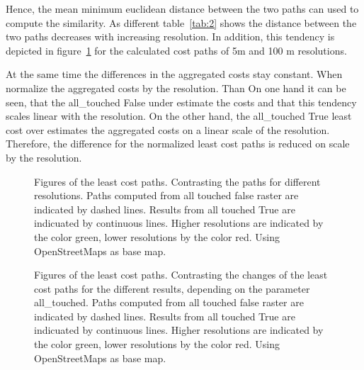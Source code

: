 \documentclass[acmtog]{acmart}
\begin{document}
	Hence, the mean minimum euclidean distance between the two paths can used to compute
	the similarity.
	As different table~\ref{tab:2} shows the distance between the two paths decreases
	with increasing resolution.
	In addition, this tendency is depicted in figure~\ref{fig:paths_resolution} for the calculated cost paths of 5m and 100 m resolutions.
	
	At the same time the differences in the aggregated costs stay constant.
	 When normalize the aggregated costs by the resolution.
	Than On one hand it can be seen, that the all\_touched False under estimate the costs and that this tendency scales
	linear with the resolution.
	On the other hand, the all\_touched True least cost over estimates the aggregated costs on a linear scale of
	the resolution.
	Therefore, the difference for the normalized least cost paths is reduced on scale by the resolution.
	
	\begin{figure}
		\centering
		
		\qquad
		\caption{Figures of the least cost paths. Contrasting the paths for different resolutions. Paths computed from all touched false raster are indicated by dashed lines. Results from all touched True are indicuated by continuous lines. Higher resolutions are indicated by the color green, lower resolutions by the color red. Using OpenStreetMaps as base map.}
		\label{fig:paths_resolution}
	\end{figure}

	\begin{figure}
		\centering
		
		\qquad
	
		\caption{Figures of the least cost paths. Contrasting the changes of the least cost paths for the different results, depending on the parameter all\_touched. Paths computed from all touched false raster are indicated by dashed lines. Results from all touched True are indicuated by continuous lines. Higher resolutions are indicated by the color green, lower resolutions by the color red. Using OpenStreetMaps as base map.}
		\label{fig:paths_alltouched}
	\end{figure}
	
\end{document}
